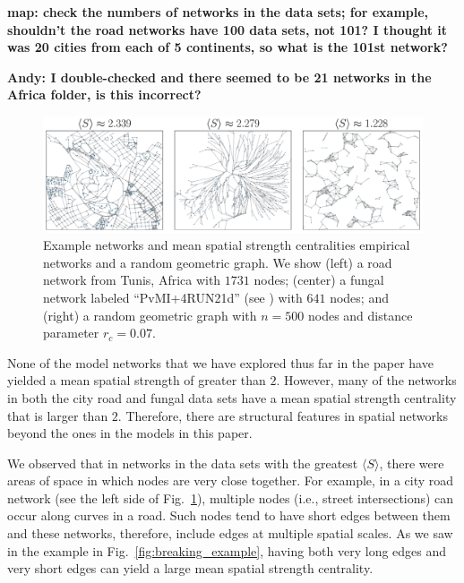\documentclass[%
 reprint,
 amsmath,amssymb,
 aps,
]{revtex4-1}
\begin{document}
{\bf map: check the numbers of networks in the data sets; for example, shouldn't the road networks have 100 data sets, not 101? I thought it was 20 cities from each of 5 continents, so what is the 101st network?}

{\bf Andy: I double-checked and there seemed to be 21 networks in the Africa folder, is this incorrect?}

\begin{figure}
    \centering
    \includegraphics[width=1.0\linewidth]{data_network_examples.pdf}
    \caption{Example networks and mean spatial strength centralities empirical networks and a random geometric graph. We show (left) a road network from Tunis, Africa with $1731$ nodes; (center) a fungal network labeled ``Pv\textunderscore M\textunderscore I+4R\textunderscore U\textunderscore N\textunderscore 21d'' (see \cite{fungal_data}) with $641$ nodes; and (right) a random geometric graph with $n = 500$ nodes and distance parameter $r_c = 0.07$.
    }
    \label{fig:data_network_examples}
\end{figure}


None of the model networks that we have explored thus far in the paper have yielded a mean spatial strength of greater than $2$.
 However, many of the networks in both the city road and fungal data sets have a mean spatial strength centrality that is larger than $2$. Therefore, there are structural features in spatial networks beyond the ones in the models in this paper.

{\color{red}We observed that in networks in the data sets with the greatest $\langle S \rangle$, there were areas of space in which nodes are very close together.}
For example, in a city road network (see the left side of Fig.~\ref{fig:data_network_examples}), multiple nodes (i.e., street intersections) can occur along curves in a road. Such nodes tend to have short edges between them and these networks, therefore, include edges at multiple spatial scales. As we saw in the example in Fig.~\ref{fig:breaking_example}, having both very long edges and very short edges can yield a large mean spatial strength centrality.
\end{document}
